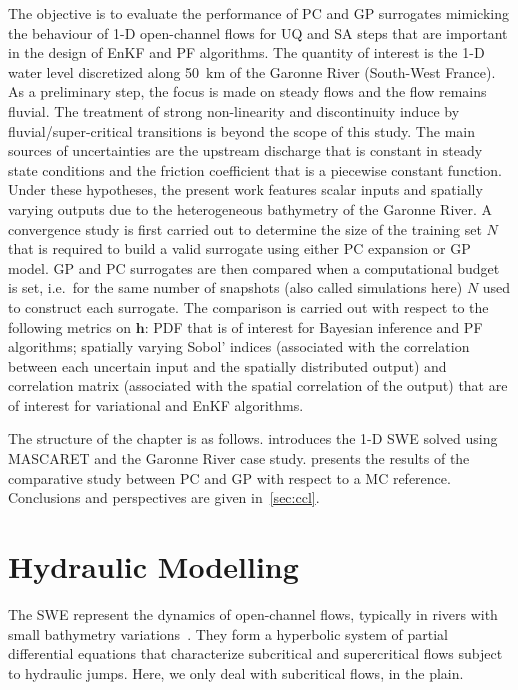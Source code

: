 The objective is to evaluate the performance of PC and GP surrogates mimicking the behaviour of 1-D open-channel flows for UQ and SA steps that are important in the design of EnKF and PF algorithms. The quantity of interest is the 1-D water level discretized along 50~km of the Garonne River (South-West France). As a preliminary step, the focus is made on steady flows and the flow remains fluvial. The treatment of strong non-linearity and discontinuity induce by fluvial/super-critical transitions is beyond the scope of this study. The main sources of uncertainties are the upstream discharge that is constant in steady state conditions and the friction coefficient that is a piecewise constant function. Under these hypotheses, the present work features scalar inputs and spatially varying outputs due to the heterogeneous bathymetry of the Garonne River. A convergence study is first carried out to determine the size of the training set $N$ that is required to build a valid surrogate using either PC expansion or GP model. GP and PC surrogates are then compared when a computational budget is set, i.e.~for the same number of snapshots (also called simulations here) $N$ used to construct each surrogate. The comparison is carried out with respect to the following metrics on $\mathbf{h}$: PDF that is of interest for Bayesian inference and PF algorithms; spatially varying Sobol' indices (associated with the correlation between each uncertain input and the spatially distributed output) and correlation matrix (associated with the spatial correlation of the output) that are of interest for variational and EnKF algorithms.

The structure of the chapter is as follows.  introduces the 1-D SWE solved using MASCARET and the Garonne River case study.  presents the results of the comparative study between PC and GP with respect to a MC reference. Conclusions and perspectives are given in~\cref{sec:ccl}.

\section{Hydraulic Modelling}\label{sec:hydrau}

The SWE represent the dynamics of open-channel flows, typically in rivers with small bathymetry variations~\citep{horritt2002}. They form a hyperbolic system of partial differential equations that characterize subcritical and supercritical flows subject to hydraulic jumps. Here, we only deal with subcritical flows, in the plain.

